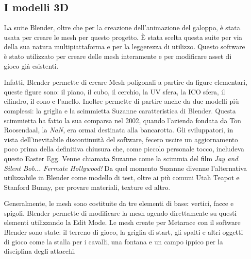     \subsection{I modelli 3D}

    La suite Blender, oltre che per la creazione dell'animazione del galoppo, è stata usata per creare le mesh per questo progetto.
    È stata scelta questa suite per via della sua natura multipiattaforma e per la leggerezza di utilizzo.
    Questo software è stato utilizzato per creare delle mesh interamente e per modificare asset di gioco già esistenti.  

    Infatti, Blender permette di creare Mesh poligonali a partire da figure elementari, queste figure sono: il piano, il cubo, il cerchio, la UV sfera, la ICO sfera, il cilindro, il cono e l'anello.
    Inoltre permette di partire anche da due modelli più complessi: la griglia e la scimmietta Suzanne caratteristica di Blender. 
    Questa scimmietta ha fatto la sua comparsa nel 2002, quando l'azienda fondata da Ton Roosendaal, la \textit{NaN}, era ormai destinata alla bancarotta.
    Gli sviluppatori, in vista dell'inevitabile discontinuità del software, fecero uscire un aggiornamento poco prima della definitiva chiusura che, come piccolo personale tocco, includeva questo Easter Egg.
    Venne chiamata Suzanne come la scimmia del film \textit{Jay and Silent Bob... Fermate Hollywood!}
    Da quel momento Suzanne divenne l'alternativa utilizzabile in Blender come modello di test, oltre ai più comuni Utah Teapot e Stanford Bunny,  per provare materiali, texture ed altro.

    Generalmente, le mesh sono costituite da tre elementi di base: vertici, facce e spigoli. 
    Blender permette di modificare la mesh agendo direttamente su questi elementi utilizzando la Edit Mode.    
    Le mesh create per Metarace con il software Blender sono state: il terreno di gioco, la griglia di start, gli spalti e altri oggetti di gioco come la stalla per i cavalli, una fontana e un campo ippico per la disciplina degli attacchi.
    
